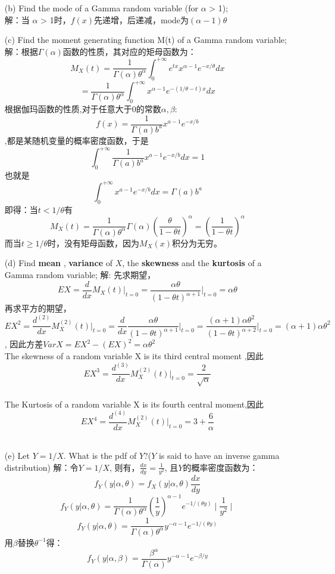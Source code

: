 \documentclass [12pt]{article}
\begin{document}
\begin{CJK*}{GBK}{kai}
\begin{enumerate}
      	\item[(b)] Find the mode of a Gamma random variable (for $\alpha$ > 1); \\
		解：当 $\alpha$ > 1时，$f(x)$先递增，后递减，mode为$(\alpha -1)\theta$
	\item[(c)] Find the moment generating function M(t) of a Gamma random variable;\\
		解：根据$\Gamma(\alpha)$函数的性质，其对应的矩母函数为：
		$$M_{X}(t)=\frac{1}{\Gamma(\alpha)\theta^\alpha} \int_{0}^{+\infty} e^{tx} x^{\alpha-1}e^{-x/\theta}dx$$
		$$=\frac{1}{\Gamma(\alpha)\theta^\alpha} \int_{0}^{+\infty} x^{\alpha-1}e^{-(1/\theta-t)x}dx$$
		根据伽玛函数的性质,对于任意大于0的常数$\alpha,\beta$:
		$$f(x)=\frac{1}{\Gamma(a)b^a}x^{a-1}e^{-x/b}$$,都是某随机变量的概率密度函数，于是
		$$\int_{0}^{+\infty}\frac{1}{\Gamma(a)b^a}x^{a-1}e^{-x/b}dx=1$$
		也就是$$\int_{0}^{+\infty}x^{a-1}e^{-x/b}dx=\Gamma(a)b^a$$
		即得：当$t<1/\theta$有
		$$M_{X}(t)=\frac{1}{\Gamma(\alpha)\theta^\alpha} \Gamma(\alpha)\left( \frac{\theta}{1-\theta t}\right)^\alpha=\left( \frac{1}{1-\theta t}\right)^\alpha$$
		而当$t\ge 1/\theta$时，没有矩母函数，因为$M_{X}(x)积分为无穷$。
	\item[(d)] Find \textbf{mean} , \textbf{variance} of $X$, the  \textbf{skewness} and the  \textbf{kurtosis} of a Gamma random variable;
      		解: 先求期望，$$EX=\frac{d}{dx}M_{X}(t)\vert_{t=0}=\frac{\alpha\theta}{(1-\theta t)^{\alpha+1}}\vert_{t=0}=\alpha\theta$$
      		再求平方的期望，$$EX^2=\frac{d^{(2)}}{dx}M_{X}^{(2)}(t)\vert_{t=0}=\frac{d}{dx}\frac{\alpha\theta}{(1-\theta t)^{\alpha+1}}\vert_{t=0}=\frac{(\alpha+1)\alpha\theta^2}{(1-\theta t)^{\alpha+2}}\vert_{t=0}=(\alpha+1)\alpha\theta^2$$,
		因此方差$VarX=EX^2-(EX)^2 =\alpha\theta^2$\\
		The skewness of a random variable X is its third central moment ,因此$$EX^3=\frac{d^{(3)}}{dx}M_{X}^{(2)}(t)\vert_{t=0}=\frac{2}{\sqrt{\alpha}}$$\\
		The Kurtosis of a random variable X is its fourth central moment,因此$$EX^4=\frac{d^{(4)}}{dx}M_{X}^{(2)}(t)\vert_{t=0}=3+\frac{6}{\alpha}$$\\
		
      	\item[(e)] Let $Y=1/X$. What is the pdf of $Y$?($Y$ is said to have an inverse gamma distribution)
      		解：令$Y=1/X$, 则有，$\frac{dx}{dy}=\frac{1}{y^2}$, 且$Y$的概率密度函数为：\\
      		$$f_{Y}(y|\alpha,\theta)=f_{X}(y|\alpha,\theta) \frac{dx}{dy}$$
      		$$f_{Y}(y|\alpha,\theta)=\frac{1}{\Gamma(\alpha)\theta^\alpha}(\frac{1}{y})^{\alpha-1}e^{-1/(\theta y)} \mid  \frac{1}{y^2}\mid$$
      		$$f_{Y}(y|\alpha,\theta)=\frac{1}{\Gamma(\alpha)\theta^\alpha}y^{-\alpha-1}e^{-1/(\theta y)} $$
      		用$\beta$替换$\theta^{-1}$得：
       		$$f_{Y}(y|\alpha,\beta)=\frac{\beta^{\alpha}}{\Gamma(\alpha)}y^{-\alpha-1}e^{-\beta/y} $$


\end{enumerate}
\end{CJK*}
\end{document}
